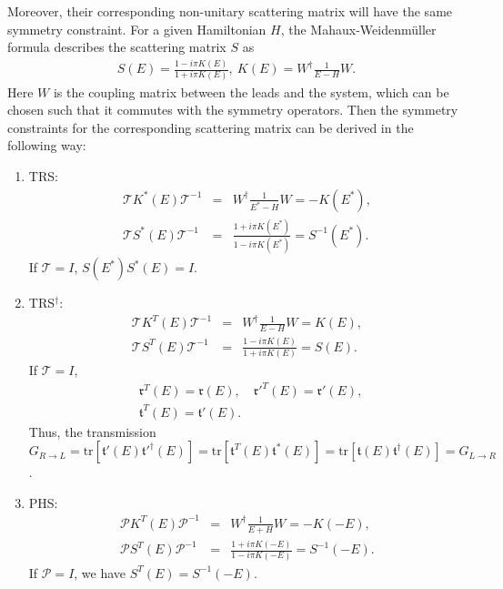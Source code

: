 \documentclass[aps,pra,reprint,superscriptaddress,showkeys,amsmath,amssymb,longbibliography]{revtex4-1}
\begin{document}
Moreover, their corresponding non-unitary scattering matrix will have the same symmetry constraint.
For a given Hamiltonian $H$, the  Mahaux-Weidenm{\"u}ller formula describes the scattering matrix $S$ as
\begin{eqnarray}
S(E)=\frac{1-i\pi K(E)}{1+i\pi K(E)},~K(E)=W^\dagger \frac{1}{E-H} W.
\end{eqnarray}
Here $W$ is the coupling matrix between the leads and the system, which can be chosen such that it commutes with the symmetry operators. 
Then the symmetry constraints for the corresponding scattering matrix can be derived in the following way:
\begin{enumerate}
  \renewcommand{\labelenumi}{(\roman{enumi})}

\item TRS:
  \begin{eqnarray}
    \mathcal{T}K^{*}(E)\mathcal{T}^{-1}&=&W^{\dagger}\frac{1}{E^{*}-H}W=-K(E^{*}),\\
    \mathcal{T}S^{*}(E)\mathcal{T}^{-1}&=&\frac{1+i\pi K(E^{*})}{1-i\pi K(E^{*})}=S^{-1}(E^{*}).
  \end{eqnarray}
  If $\mathcal{T}=I$, $S(E^{*})S^{*}(E)=I$.

\item TRS$^{\dagger}$:
  \begin{eqnarray}
    \mathcal{T}K^{T}(E)\mathcal{T}^{-1}&=&
                                           W^{\dagger}\frac{1}{E-H}W=K(E),\\
    \mathcal{T}S^{T}(E)\mathcal{T}^{-1}&=&
                                           \frac{1-i\pi K(E)}{1+i\pi K(E)}=S(E).
  \end{eqnarray}
  If $\mathcal{T}=I$,
  \begin{eqnarray}
    &&
    \mathfrak{r}^T(E)=\mathfrak{r}(E),\quad \mathfrak{r}'^{T}(E)=\mathfrak{r}'(E), \quad
    \nonumber \\
    &&
    \mathfrak{t}^{T}(E)=\mathfrak{t}'(E).
  \end{eqnarray}
  Thus, the transmission $G_{R\rightarrow L}=\text{tr}[\mathfrak{t}'(E)\mathfrak{t}'^{\dagger}(E)]=\text{tr}[\mathfrak{t}^T(E)\mathfrak{t}^{*}(E)]=\text{tr}[\mathfrak{t}(E)\mathfrak{t}^{\dagger}(E)]=G_{L\rightarrow R}$.

\item PHS:
  \begin{eqnarray}
    \mathcal{P}K^T(E)\mathcal{P}^{-1}&=&W^{\dagger}\frac{1}{E+H}W=-K(-E),\\
    \mathcal{P}S^T(E)\mathcal{P}^{-1}&=&\frac{1+i\pi K(-E)}{1-i\pi K(-E)}=S^{-1}(-E).
  \end{eqnarray}
  If $\mathcal{P}=I$, we have $S^T(E)=S^{-1}(-E)$.


\end{enumerate}
\end{document}
